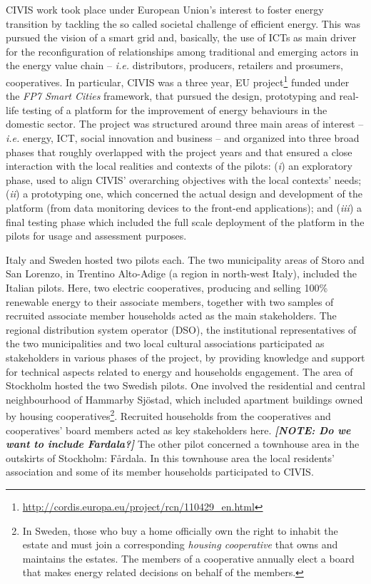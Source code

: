 CIVIS work took place under European Union’s interest to foster energy transition by tackling the so called societal challenge of efficient energy. 
This was pursued the vision of a smart grid and, basically, the use of ICTs as main driver for the
reconfiguration of relationships among traditional and emerging actors in the energy value chain – \textit{i.e.} distributors, producers, retailers and prosumers, cooperatives.
In particular, CIVIS was a three year, EU project\footnote{\url{http://cordis.europa.eu/project/rcn/110429\_en.html}} funded under the \textit{FP7 Smart Cities} framework, that pursued the design,
prototyping and real-life testing of a platform for the improvement of energy behaviours in the domestic sector. The project was structured around three main areas
of interest – \textit{i.e.} energy, ICT, social innovation and business – and organized into three broad phases that roughly
overlapped with the project years and that ensured a close interaction with the local realities and contexts of
the pilots: (\textit{i}) an exploratory phase, used to align CIVIS’ overarching objectives with the local contexts’ needs;
(\textit{ii}) a prototyping one, which concerned the actual design and development of the platform (from data monitoring devices to the
front-end applications); and (\textit{iii}) a final testing phase which included the full scale deployment of the platform in the pilots for usage and assessment purposes.

Italy and Sweden hosted two pilots each. 
The two municipality areas of Storo and San Lorenzo, in Trentino Alto-Adige (a region in north-west Italy), included the
Italian pilots. Here, two electric cooperatives, producing and selling 100\% renewable energy
to their associate members, together with two samples of recruited associate member households acted as the main stakeholders.
The regional distribution system operator (DSO), the institutional representatives of the two municipalities and two local cultural associations participated as
stakeholders in various phases of the project, by providing knowledge and support for technical aspects related
to energy and households engagement.
The area of Stockholm hosted the two Swedish pilots. One involved the residential and central neighbourhood
of Hammarby Sj\"{o}stad, which included apartment buildings owned by housing cooperatives\footnote{In Sweden, those who buy a home officially own the right to inhabit the estate and must
join a corresponding \textit{housing cooperative} that owns and maintains the estates. The members of a cooperative
annually elect a board that makes energy related decisions on behalf of the members.}.
Recruited households from the cooperatives and cooperatives' board members acted
as key stakeholders here. \textbf{\textit{[NOTE: Do we want to include Fardala?]}} The other pilot concerned a townhouse area in the outskirts of Stockholm: F\aa{}rdala. In this townhouse
area the local residents’ association and some of its member households participated to CIVIS.



